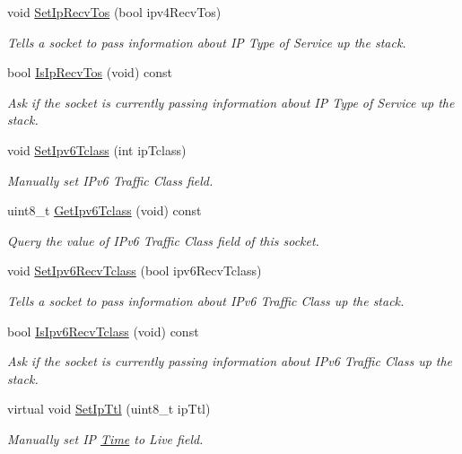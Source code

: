 \begin{DoxyCompactItemize}
void \hyperlink{classns3_1_1Socket_a553ae08f9833337fd535e7b7aaf24646}{Set\+Ip\+Recv\+Tos} (bool ipv4\+Recv\+Tos)
\begin{DoxyCompactList}\small\item\em Tells a socket to pass information about IP Type of Service up the stack. \end{DoxyCompactList}\item 
bool \hyperlink{classns3_1_1Socket_a5b5addd1a33e306c3113c547705835f9}{Is\+Ip\+Recv\+Tos} (void) const 
\begin{DoxyCompactList}\small\item\em Ask if the socket is currently passing information about IP Type of Service up the stack. \end{DoxyCompactList}\item 
void \hyperlink{classns3_1_1Socket_ae3fbf3bd80b26501b02543223419c9c8}{Set\+Ipv6\+Tclass} (int ip\+Tclass)
\begin{DoxyCompactList}\small\item\em Manually set I\+Pv6 Traffic Class field. \end{DoxyCompactList}\item 
uint8\+\_\+t \hyperlink{classns3_1_1Socket_aed62162f0b5f322b1fa23b7350c3c2ce}{Get\+Ipv6\+Tclass} (void) const 
\begin{DoxyCompactList}\small\item\em Query the value of I\+Pv6 Traffic Class field of this socket. \end{DoxyCompactList}\item 
void \hyperlink{classns3_1_1Socket_aebb71eb44a2621d4d5339f6a3c437f5c}{Set\+Ipv6\+Recv\+Tclass} (bool ipv6\+Recv\+Tclass)
\begin{DoxyCompactList}\small\item\em Tells a socket to pass information about I\+Pv6 Traffic Class up the stack. \end{DoxyCompactList}\item 
bool \hyperlink{classns3_1_1Socket_ad9b8d1ceb1e0b80609b7c6a1c1392eec}{Is\+Ipv6\+Recv\+Tclass} (void) const 
\begin{DoxyCompactList}\small\item\em Ask if the socket is currently passing information about I\+Pv6 Traffic Class up the stack. \end{DoxyCompactList}\item 
virtual void \hyperlink{classns3_1_1Socket_a053afd293ef67a359681445c5c7bef2c}{Set\+Ip\+Ttl} (uint8\+\_\+t ip\+Ttl)
\begin{DoxyCompactList}\small\item\em Manually set IP \hyperlink{classns3_1_1Time}{Time} to Live field. \end{DoxyCompactList}\item 

\end{DoxyCompactItemize}
